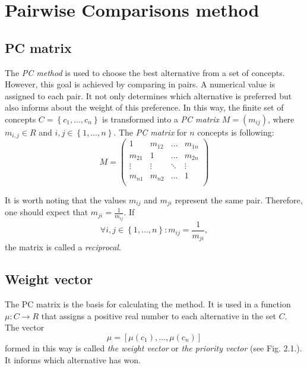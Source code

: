 \chapter{Pairwise Comparisons method}
\label{sec:pcMethod}
  \section{PC matrix}
	\label{subsec:macierzPC}
	
	The \textit{PC method} is used to choose the best alternative from a set of concepts. However, this goal is achieved by comparing in pairs. A numerical value is assigned to each pair. It not only determines which alternative is preferred but also informs about the weight of this preference. In this way, the finite set of concepts $C=\left\{ c_{1},\ldots,c_{n}\right\} $ is transformed into a \textit{PC matrix} $M=\left(m_{ij}\right)$, where $m_{i,j}\in R$ and $i,j\in\left\{ 1,\ldots,n\right\}$. The \textit{PC matrix} for $n$ concepts is following:
$$
M = 
\left(
\begin{array}{lllll}
	1 & m_{12} & \dots & m_{1n}\\
	m_{21} & 1 & \dots & m_{2n}\\
	\vdots & \vdots & \ddots & \vdots\\
	m_{n1} & m_{n2} & \dots & 1\\ 	
\end{array}
\right)
$$

	It is worth noting that the values $m_{ij}$ and $m_{ji}$ represent the same pair. Therefore, one should expect that $m_{ji}=\frac{1}{m_{ij}}$. If
	\begin{equation} 
		\forall i,j\in\left\{ 1,\ldots,n\right\} :m_{ij}=\frac{1}{m_{ji}},
	\end{equation}
		the matrix is called a \textit{reciprocal}.

  \section{Weight vector}
	\label{subsec:wektorWag}
	
	The PC matrix is the basis for calculating the method. It is used in a function $\mu:C\rightarrow R$ that assigns a positive real number to each alternative in the set $C$. The vector $$\mu=\left[\mu\left(c_{1}\right),\ldots,\mu\left(c_{n}\right)\right]$$ formed in this way is called \textit{the weight vector} or \textit{the priority vector} (see Fig. 2.1.). It informs which alternative has won.

